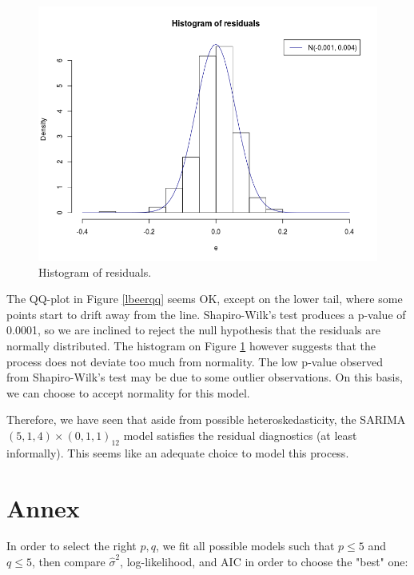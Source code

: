 \documentclass[]{article}
\begin{document}
\begin{figure}[!ht]
\centering
\includegraphics[width=.8\textwidth]{lbeerhist.png}
\caption{Histogram of residuals.}
\label{lbeerhist}
\end{figure}

The QQ-plot in Figure \ref{lbeerqq} seems OK, except on the lower tail, where some points start to drift away from the line. Shapiro-Wilk's test produces a p-value of 0.0001, so we are inclined to reject the null hypothesis that the residuals are normally distributed. The histogram on Figure \ref{lbeerhist} however suggests that the process does not deviate too much from normality. The low p-value observed from Shapiro-Wilk's test may be due to some outlier observations. On this basis, we can choose to accept normality for this model.

Therefore, we have seen that aside from possible heteroskedasticity, the SARIMA $(5,1,4)\times(0,1,1)_{12}$ model satisfies the residual diagnostics (at least informally). This seems like an adequate choice to model this process. 

\color{black}

\newpage
\section{Annex}
\color{blue}
In order to select the right $p, q$, we fit all possible models such that $p\leq5$ and $q\leq5$, then compare $\hat{\sigma}^2$, log-likelihood, and AIC in order to choose the "best" one:
\end{document}
